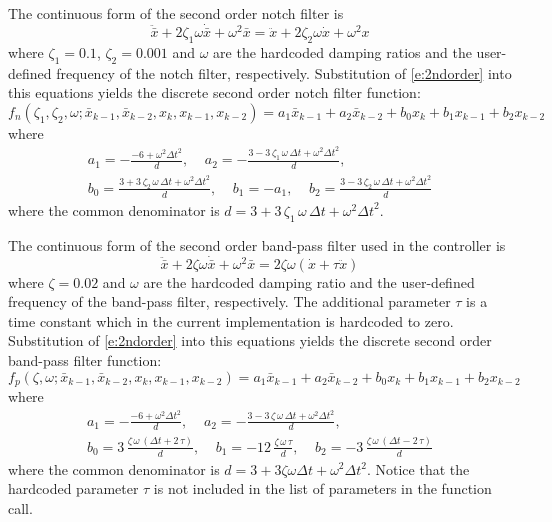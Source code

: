 The continuous form of the second order notch filter is
\begin{equation}
\label{e:fncont}
\ddot{\bar x} + 2 \zeta_1 \omega \dot{\bar x} + \omega^2\bar x = \ddot{x} + 2 \zeta_2 \omega \dot{x} + \omega^2 x
\end{equation}
where $\zeta_1=0.1$, $\zeta_2=0.001$ and $\omega$ are the hardcoded damping ratios and the user-defined frequency of the notch filter, respectively. Substitution of \eqref{e:2ndorder} into this equations yields the discrete second order notch filter function:
\begin{equation}
\label{e:fn}
f_n \left(\zeta_{1}, \zeta_{2}, \omega; \bar x_{k-1} , \bar x_{k-2} , x_{k} , x_{k-1} , x_{k-2} \right) = a_1 \bar x_{k-1} + a_2 \bar x_{k-2} + b_0 x_k + b_1 x_{k-1}+ b_2 x_{k-2}
\end{equation}
where
\begin{gather}\nonumber
a_1=-{\frac {-6+{\omega}^{2}{\Delta t}^{2}}{d}},
\;\;\;\;
a_2=-{\frac {3-3\,\zeta_{1}\,\omega\,\Delta t+{\omega}^{2}{\Delta t}^{2}}{d}}, \\
\label{e:fncoef}
b_0 = {\frac {3+3\,\zeta_{2}\,\omega\,\Delta t+{\omega}^{2}{\Delta t}^{2}}{d}}, \;\;\;\;
b_1 = -a_1,\;\;\;\;
b_2 = {\frac {3-3\,\zeta_{2}\,\omega\,\Delta t+{\omega}^{2}{\Delta t}^{2}}{d}}
\end{gather}
where the common denominator is $d=3+3\,\zeta_{1}\,\omega\,\Delta t+{\omega}^{2}{\Delta t}^{2}$.

The continuous form of the second order band-pass filter used in the controller is
\begin{equation}
\label{e:fpcont}
\ddot{\bar x} + 2 \zeta \omega \dot{\bar x} + \omega^2\bar x = 2 \zeta \omega \left(\dot{x} + \tau \ddot{x}\right)
\end{equation}
where $\zeta=0.02$ and $\omega$ are the hardcoded damping ratio and the user-defined frequency of the band-pass filter, respectively. The additional parameter $\tau$ is a time constant which in the current implementation is hardcoded to zero. Substitution of \eqref{e:2ndorder} into this equations yields the discrete second order band-pass filter function:
\begin{equation}
\label{e:fp}
f_p \left(\zeta, \omega; \bar x_{k-1} , \bar x_{k-2} , x_{k} , x_{k-1} , x_{k-2} \right) = a_1 \bar x_{k-1} + a_2 \bar x_{k-2} + b_0 x_k + b_1 x_{k-1}+ b_2 x_{k-2}
\end{equation}
where
\begin{gather}\nonumber
a_1 =-{\frac {-6+{\omega}^{2}{\Delta t}^{2}}{d}},\;\;\;\;
a_2 =-{\frac {3-3\,\zeta\,\omega\,\Delta t+{\omega}^{2}{\Delta t}^{2}}{d}}, \\
\label{e:fpcoef}
b_0 =3\,{\frac {\zeta\,\omega\, \left( \Delta t+2\,\tau \right) }{d}},\;\;\;\;
b_1 =-12\,{\frac {\zeta\,\omega\,\tau}{d}},\;\;\;\;
b_2 =-3\,{\frac {\zeta\,\omega\, \left( \Delta t-2\,\tau \right) }{d}}
\end{gather}
where the common denominator is $d=3+3 \zeta \omega \Delta t+\omega^2 \Delta t^2$. Notice that the hardcoded parameter $\tau$ is not included in the list of parameters in the function call.

